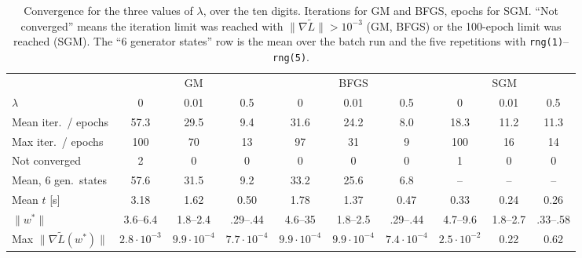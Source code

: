 \begin{table}[h]
\centering
\small
\setlength{\tabcolsep}{3pt}
\begin{tabular}{l ccc ccc ccc}
\toprule
 & \multicolumn{3}{c}{GM} & \multicolumn{3}{c}{BFGS} & \multicolumn{3}{c}{SGM} \\
\cmidrule(lr){2-4}\cmidrule(lr){5-7}\cmidrule(lr){8-10}
$\lambda$ & 0 & 0.01 & 0.5 & 0 & 0.01 & 0.5 & 0 & 0.01 & 0.5 \\
\midrule
Mean iter.\ / epochs & 57.3 & 29.5 & 9.4 & 31.6 & 24.2 & 8.0 & 18.3 & 11.2 & 11.3 \\
Max iter.\ / epochs & 100 & 70 & 13 & 97 & 31 & 9 & 100 & 16 & 14 \\
Not converged & 2 & 0 & 0 & 0 & 0 & 0 & 1 & 0 & 0 \\
Mean, 6 gen.\ states & 57.6 & 31.5 & 9.2 & 33.2 & 25.6 & 6.8 & -- & -- & -- \\
Mean $t$ [s] & 3.18 & 1.62 & 0.50 & 1.78 & 1.37 & 0.47 & 0.33 & 0.24 & 0.26 \\
$\|w^*\|$ & 3.6--6.4 & 1.8--2.4 & .29--.44 & 4.6--35 & 1.8--2.5 & .29--.44 & 4.7--9.6 & 1.8--2.7 & .33--.58 \\
Max $\|\nabla\tilde L(w^*)\|$ & $2.8{\cdot}10^{-3}$ & $9.9{\cdot}10^{-4}$ & $7.7{\cdot}10^{-4}$ & $9.9{\cdot}10^{-4}$ & $9.9{\cdot}10^{-4}$ & $7.4{\cdot}10^{-4}$ & $2.5{\cdot}10^{-2}$ & 0.22 & 0.62 \\
\bottomrule
\end{tabular}
\caption{Convergence for the three values of $\lambda$, over the ten digits. Iterations for GM and BFGS, epochs for SGM. ``Not converged'' means the iteration limit was reached with $\|\nabla\tilde L\|>10^{-3}$ (GM, BFGS) or the 100-epoch limit was reached (SGM). The ``6 generator states'' row is the mean over the batch run and the five repetitions with \texttt{rng(1)}--\texttt{rng(5)}.}
\label{tab:convlambda}
\end{table}

